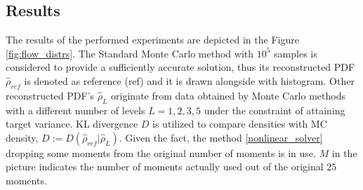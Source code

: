 \documentclass{article}
\begin{document}
\subsection{Results}
The results of the performed experiments are depicted in the Figure \ref{fig:flow_distrs}. The Standard Monte Carlo method with $10^5$ samples is considered to provide a sufficiently accurate solution, thus its reconstructed PDF $\hat{\rho}_{ref}$ is denoted as reference (ref) and it is drawn alongside with histogram. Other reconstructed PDF's $\hat{\rho}_{L}$  originate from data obtained by Monte Carlo methods with a different number of levels $L = 1, 2, 3, 5$ under the constraint of attaining target variance. 
KL divergence $D$ is utilized to compare densities with MC density, $D := D(\hat{\rho}_{ref}|\hat{\rho}_{L})$.
Given the fact, the method \ref{nonlinear_solver} dropping some moments from the original number of moments is in use. $M$ in the picture indicates the number of moments actually used out of the original $25$ moments.
\end{document}
